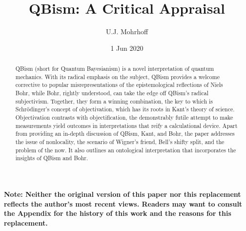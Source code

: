 \documentclass[12pt]{article}
\begin{document}
\title{QBism: A Critical Appraisal}%
\author{U.J. Mohrhoff}


\date{1 Jun 2020}
\maketitle

\vspace{0.5in}
\begin{abstract}
QBism (short for Quantum Bayesianism) is a novel interpretation of quantum mechanics. With its radical emphasis on the subject, QBism provides a welcome corrective to popular misrepresentations of the epistemological reflections of Niels Bohr, while Bohr, rightly understood, can take the edge off QBism's radical subjectivism. Together, they form a winning combination, the key to which is Schr\"odinger's concept of objectivation, which has its roots in Kant's theory of science. Objectivation contrasts with objectification, the demonstrably futile attempt to make measurements yield outcomes in interpretations that reify a calculational device. Apart from providing an in-depth discussion of QBism, Kant, and Bohr, the paper addresses the issue of nonlocality, the scenario of Wigner's friend, Bell's shifty split, and the problem of the now. It also outlines an ontological interpretation that incorporates the insights of QBism and Bohr.
\end{abstract}%

\newpage
\noindent \textbf{Note: Neither the original version of this paper nor this replacement reflects the author's most recent views. Readers may want to consult the Appendix for the history of this work and the reasons for this replacement.}
\newpage
\end{document}
